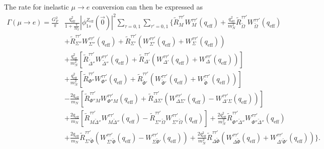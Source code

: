 \documentclass{book}[letterpaper,12pt]
\begin{document}
The rate for inelastic $\mu\rightarrow e$ conversion can then be expressed as
\begin{equation}
\begin{split}
\Gamma\left(\mu\rightarrow e\right)=\frac{G_F^2}{\pi}&\frac{q_\mathrm{eff}^2}{1+\frac{q}{M_T}}|\phi_{1s}^{Z_\mathrm{eff}}(\vec{0})|^2\sum_{\tau=0,1}\sum_{\tau'=0,1}\Bigg\{\tilde{R}_M^{\tau\tau'}W_M^{\tau\tau'}(q_\mathrm{eff})+\frac{q_\mathrm{eff}^2}{m_N^2}\tilde{R}_{\tilde{\Omega}}^{\tau\tau'}W_{\tilde{\Omega}}^{\tau\tau'}(q_\mathrm{eff})\\
&+\tilde{R}_{\Sigma''}^{\tau\tau'}W_{\Sigma''}^{\tau\tau'}(q_\mathrm{eff})+\tilde{R}_{\Sigma'}^{\tau\tau'}\left(W_{\Sigma'}^{\tau\tau'}(q_\mathrm{eff})+W_{\Sigma}^{\tau\tau'}(q_\mathrm{eff})\right)\\
&+\frac{q_\mathrm{eff}^2}{m_N^2}\left[\tilde{R}_{\tilde{\Delta}''}^{\tau\tau'}W_{\tilde{\Delta}''}^{\tau\tau'}(q_\mathrm{eff})+\tilde{R}_{\Delta'}^{\tau\tau'}\left(W_{\Delta'}^{\tau\tau'}(q_\mathrm{eff})+W_{\Delta}^{\tau\tau'}(q_\mathrm{eff})\right)\right]\\
&+\frac{q_\mathrm{eff}^2}{m_N^2}\left[\tilde{R}_{\Phi''}^{\tau\tau'}W_{\Phi''}^{\tau\tau'}(q_\mathrm{eff})+\tilde{R}_{\tilde{\Phi}'}^{\tau\tau'}\left(W_{\tilde{\Phi}'}^{\tau\tau'}(q_\mathrm{eff})+W_{\tilde{\Phi}}^{\tau\tau'}(q_\mathrm{eff})\right)\right]\\
&-\frac{2q_\mathrm{eff}}{m_N}\left[\tilde{R}_{\Phi'' M}^{\tau\tau'}W_{\Phi'' M}^{\tau\tau'}(q_\mathrm{eff})+\tilde{R}_{\Delta\Sigma'}^{\tau\tau'}\left(W_{\Delta\Sigma'}^{\tau\tau'}(q_\mathrm{eff})-W_{\Delta'\Sigma}^{\tau\tau'}(q_\mathrm{eff})\right)\right]\\
&+\frac{2q_\mathrm{eff}}{m_N}\left[\tilde{R}^{\tau\tau'}_{M\tilde{\Delta}''}W^{\tau\tau'}_{M\tilde{\Delta}''}(q_\mathrm{eff})-\tilde{R}^{\tau\tau'}_{\Sigma''\tilde{\Omega}}W^{\tau\tau'}_{\Sigma''\tilde{\Omega}}(q_\mathrm{eff})\right]+\frac{2q_\mathrm{eff}^2}{m_N^2}\tilde{R}_{\Phi''\tilde{\Delta}''}^{\tau\tau'}W^{\tau\tau'}_{\Phi''\tilde{\Delta}''}(q_\mathrm{eff})\\
&+\frac{2q_\mathrm{eff}}{m_N}\tilde{R}^{\tau\tau'}_{\Sigma'\tilde{\Phi}}\left(W^{\tau\tau'}_{\Sigma'\tilde{\Phi}}(q_\mathrm{eff})-W^{\tau\tau'}_{\Sigma\tilde{\Phi}'}(q_\mathrm{eff})\right)+\frac{2q_\mathrm{eff}^2}{m_N^2}\tilde{R}^{\tau\tau'}_{\Delta\tilde{\Phi}}\left(W^{\tau\tau'}_{\Delta\tilde{\Phi}}(q_\mathrm{eff})+W^{\tau\tau'}_{\Delta'\tilde{\Phi}'}(q_\mathrm{eff})\right)\Bigg\}.
\end{split}
\label{eq:inelastic_rate}
\end{equation}
\end{document}
